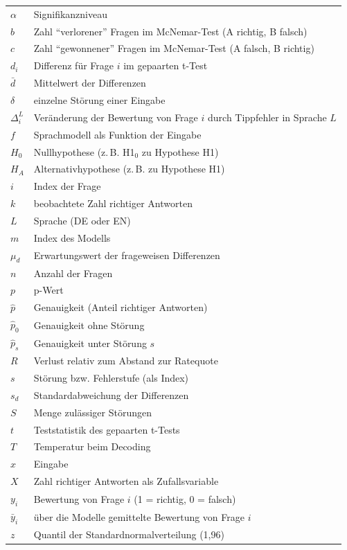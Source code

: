 \documentclass[a4paper,titlepage]{article}
\numberwithin{equation}{section} %
\begin{document}
{
\begin{longtable}{@{}p{2.2cm}p{10cm}@{}}
$\alpha$            & Signifikanzniveau \\
$b$                 & Zahl "`verlorener"' Fragen im McNemar-Test (A richtig, B falsch) \\
$c$                 & Zahl "`gewonnener"' Fragen im McNemar-Test (A falsch, B richtig) \\
$d_i$               & Differenz für Frage $i$ im gepaarten t-Test \\
$\bar{d}$           & Mittelwert der Differenzen \\
$\delta$            & einzelne Störung einer Eingabe \\
$\Delta_i^L$        & Veränderung der Bewertung von Frage $i$ durch Tippfehler in Sprache $L$ \\
$f$                 & Sprachmodell als Funktion der Eingabe \\
$H_0$               & Nullhypothese (z.\,B. H1$_0$ zu Hypothese H1) \\
$H_A$               & Alternativhypothese (z.\,B. zu Hypothese H1) \\
$i$                 & Index der Frage \\
$k$                 & beobachtete Zahl richtiger Antworten \\
$L$                 & Sprache (DE oder EN) \\
$m$                 & Index des Modells \\
$\mu_d$             & Erwartungswert der frageweisen Differenzen \\
$n$                 & Anzahl der Fragen \\
$p$                 & p-Wert \\
$\hat{p}$           & Genauigkeit (Anteil richtiger Antworten) \\
$\hat{p}_0$         & Genauigkeit ohne Störung \\
$\hat{p}_s$         & Genauigkeit unter Störung $s$ \\
$R$                 & Verlust relativ zum Abstand zur Ratequote \\
$s$                 & Störung bzw. Fehlerstufe (als Index) \\
$s_d$               & Standardabweichung der Differenzen \\
$S$                 & Menge zulässiger Störungen \\
$t$                 & Teststatistik des gepaarten t-Tests \\
$T$                 & Temperatur beim Decoding \\
$x$                 & Eingabe \\
$X$                 & Zahl richtiger Antworten als Zufallsvariable \\
$y_i$               & Bewertung von Frage $i$ (1 = richtig, 0 = falsch) \\
$\bar{y}_i$         & über die Modelle gemittelte Bewertung von Frage $i$ \\
$z$                 & Quantil der Standardnormalverteilung (1,96) \\
\end{longtable}
}
\newpage
\end{document}
